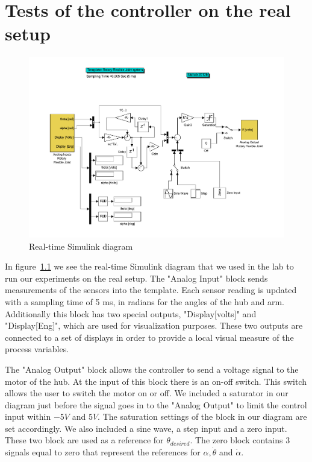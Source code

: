 \documentclass[ twoside,openright,titlepage,numbers=noenddot,headinclude,%
                footinclude=true,cleardoublepage=empty,abstractoff, %
                BCOR=5mm,paper=a4,fontsize=11pt,%
                ngerman,american,%
                ]{scrreprt}
\begin{document}
{\chapter{Tests of the controller on the real setup}

\begin{figure} 
  \centering
  \includegraphics[scale=0.4]{images/realtimeSimDiagram}
  \caption{Real-time Simulink diagram} 
  \label{realtimeSimDiagram}
\end{figure}

In figure~\ref{realtimeSimDiagram} we see the real-time Simulink diagram that we used in the lab to run our experiments on the real setup. The "Analog Input" block sends measurements of the sensors into the template. Each sensor reading is updated with a sampling time of 5 ms, in radians for the angles of the hub and arm. Additionally this block has two special outputs, "Display[volts]" and "Display[Eng]", which are used for visualization purposes. These two outputs are connected to a set of displays in order to provide a local visual measure of the process variables. 

The "Analog Output" block allows the controller to send a voltage signal to the motor of the hub. At the input of this block there is an on-off switch. This switch allows the user to switch the motor on or off. We included a saturator in our diagram just before the signal goes in to the "Analog Output" to limit the control input within $-5V$ and $5V$. The saturation settings of the block in our diagram are set accordingly. We also included a sine wave, a step input and a zero input. These two block are used as a reference for $\theta_{desired}$. The zero block contains 3 signals equal to zero that represent the references for $\alpha, \dot{\theta}$ and $\dot{\alpha}$.


}
\end{document}
